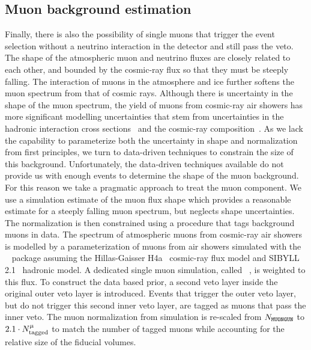 \subsection{Muon background estimation}\label{sec:muon_background}
Finally, there is also the possibility of single muons that trigger the event selection without a neutrino interaction in the detector and still pass the veto.
The shape of the atmospheric muon and neutrino fluxes are closely related to each other, and bounded by the cosmic-ray flux so that they must be steeply falling.
The interaction of muons in the atmosphere and ice further softens the muon spectrum from that of cosmic rays.
Although there is uncertainty in the shape of the muon spectrum, the yield of muons from cosmic-ray air showers has more significant modelling uncertainties that stem from uncertainties in the hadronic interaction cross sections~\cite{Pierog:2017nes} and the cosmic-ray composition~\cite{Bluemer:2009zf}.
As we lack the capability to parameterize both the uncertainty in shape and normalization from first principles, we turn to data-driven techniques to constrain the size of this background.
Unfortunately, the data-driven techniques available do not provide us with enough events to determine the shape of the muon background.
For this reason we take a pragmatic approach to treat the muon component.
We use a simulation estimate of the muon flux shape which provides a reasonable estimate for a steeply falling muon spectrum, but neglects shape uncertainties.
The normalization is then constrained using a procedure that tags background muons in data.
The spectrum of atmospheric muons from cosmic-ray air showers is modelled by a parameterization of muons from air showers simulated with the \CORSIKA~\cite{Heck:1998vt} package assuming the Hillas-Gaisser H4a~\cite{Gaisser:2013bla} cosmic-ray flux model and SIBYLL 2.1~\cite{Ahn:2009wx} hadronic model.
A dedicated single muon simulation, called \MUONGUN~\cite{jvsthesis}, is weighted to this flux. 
To construct the data based prior, a second veto layer inside the original outer veto layer is introduced.
Events that trigger the outer veto layer, but do not trigger this second inner veto layer, are tagged as muons that pass the inner veto.
The muon normalization from simulation is re-scaled from $N_{\texttt{MUONGUN}}$ to $2.1\cdot N^\mu_\textmd{tagged}$ to match the number of tagged muons while accounting for the relative size of the fiducial volumes.
